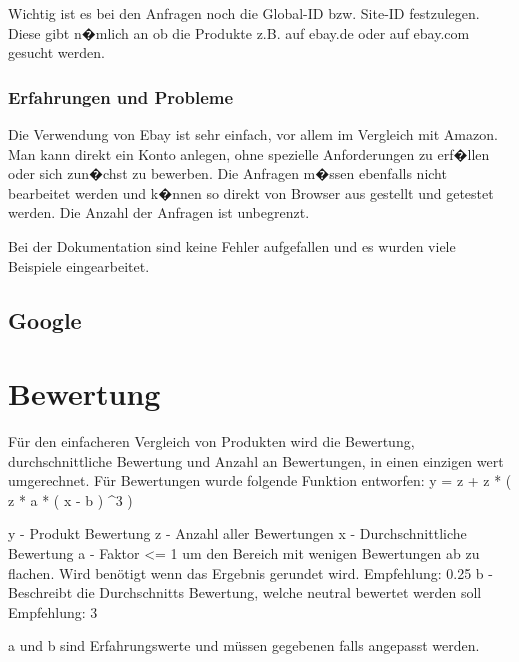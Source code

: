 Wichtig ist es bei den Anfragen noch die Global-ID bzw. Site-ID festzulegen. Diese gibt n�mlich an ob die Produkte z.B. auf ebay.de oder auf ebay.com gesucht werden.

\subsection{Erfahrungen und Probleme}
Die Verwendung von Ebay ist sehr einfach, vor allem im Vergleich mit Amazon. Man kann direkt ein Konto anlegen, ohne spezielle Anforderungen zu erf�llen oder sich zun�chst zu bewerben. Die Anfragen m�ssen ebenfalls nicht bearbeitet werden und k�nnen so direkt von Browser aus gestellt und getestet werden. Die Anzahl der Anfragen ist unbegrenzt.

Bei der Dokumentation sind keine Fehler aufgefallen und es wurden viele Beispiele eingearbeitet.
\section{Google}

\chapter{Bewertung}
Für den einfacheren Vergleich von Produkten wird die Bewertung, durchschnittliche Bewertung und Anzahl an Bewertungen, in einen einzigen wert umgerechnet.
Für Bewertungen wurde folgende Funktion entworfen:
y = z + z * ( z * a * ( x - b ) ^3 )

y - Produkt Bewertung
z - Anzahl aller Bewertungen
x - Durchschnittliche Bewertung
a - Faktor <= 1 um den Bereich mit wenigen Bewertungen ab zu flachen.
    Wird benötigt wenn das Ergebnis gerundet wird.
    Empfehlung: 0.25
b - Beschreibt die Durchschnitts Bewertung, welche neutral bewertet werden soll
    Empfehlung: 3

a und b sind Erfahrungswerte und müssen gegebenen falls angepasst werden.


